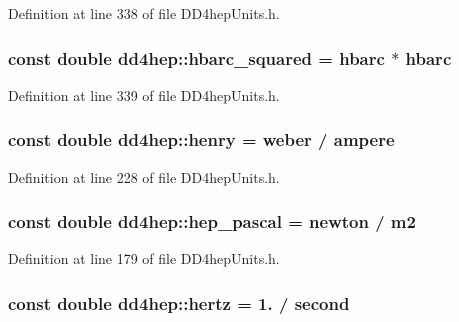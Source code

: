 Definition at line 338 of file DD4hepUnits.h.\hypertarget{namespacedd4hep_acf9f3f7006e079db9d63413e8c861d94}{
\subsubsection[{hbarc\_\-squared}]{\setlength{\rightskip}{0pt plus 5cm}const double {\bf dd4hep::hbarc\_\-squared} = {\bf hbarc} $\ast$ {\bf hbarc}}}
\label{namespacedd4hep_acf9f3f7006e079db9d63413e8c861d94}


Definition at line 339 of file DD4hepUnits.h.\hypertarget{namespacedd4hep_adc130a4b9874431a4fb19fa27220372c}{
\subsubsection[{henry}]{\setlength{\rightskip}{0pt plus 5cm}const double {\bf dd4hep::henry} = {\bf weber} / {\bf ampere}}}
\label{namespacedd4hep_adc130a4b9874431a4fb19fa27220372c}


Definition at line 228 of file DD4hepUnits.h.\hypertarget{namespacedd4hep_ad7dfeb546cf76cb6959665edbfd320bb}{
\subsubsection[{hep\_\-pascal}]{\setlength{\rightskip}{0pt plus 5cm}const double {\bf dd4hep::hep\_\-pascal} = {\bf newton} / {\bf m2}}}
\label{namespacedd4hep_ad7dfeb546cf76cb6959665edbfd320bb}


Definition at line 179 of file DD4hepUnits.h.\hypertarget{namespacedd4hep_a5ada76b9ea37d13e1e346f2256017cff}{
\subsubsection[{hertz}]{\setlength{\rightskip}{0pt plus 5cm}const double {\bf dd4hep::hertz} = 1. / {\bf second}}}
\label{namespacedd4hep_a5ada76b9ea37d13e1e346f2256017cff}


